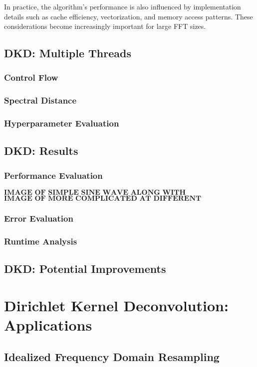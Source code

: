 \documentclass[11pt,twoside]{report}
\numberwithin{thm}{section}
\numberwithin{equation}{section}
\begin{document}
In practice, the algorithm's performance is also influenced by implementation details such as cache efficiency, vectorization, and memory access patterns. These considerations become increasingly important for large FFT sizes.

\section{DKD: Multiple Threads}
\subsection{Control Flow}
\subsection{Spectral Distance}
\subsection{Hyperparameter Evaluation}
\section{DKD: Results}
\subsection{Performance Evaluation}
$$\textbf{IMAGE OF SIMPLE SINE WAVE ALONG WITH RECONSTRUCTION}$$
$$\textbf{IMAGE OF MORE COMPLICATED AT DIFFERENT COMPONENT LEVELS}$$
\subsection{Error Evaluation}
\subsection{Runtime Analysis}

\section{DKD: Potential Improvements}
\chapter{Dirichlet Kernel Deconvolution: Applications}

\section{Idealized Frequency Domain Resampling}
\end{document}
